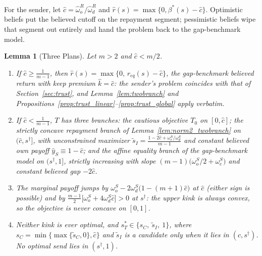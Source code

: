 \documentclass[11pt]{article}
\theoremstyle{plain}
\newtheorem{lemma}{Lemma}
\theoremstyle{remark}
\begin{document}
For the sender, let $\hat c=\hat\omega_o^{R}/\hat\omega_d^{R}$ and $\hat r(s)=\max\{0,\beta^\ast(s)-\hat c\}$.  Optimistic beliefs put the believed cutoff on the repayment segment; pessimistic beliefs wipe that segment out entirely and hand the problem back to the gap-benchmark model.

\begin{lemma}[Three Plans]
\label{lem:norm3_threeplan}
Let $m>2$ and $\hat c<m/2$.
\begin{enumerate}[topsep=2pt,itemsep=2pt]
\item If $\hat c\ge\frac1{m-1}$, then $\hat r(s)=\max\{0,\,r_{eq}(s)-\hat c\}$, the gap-benchmark believed return with keep premium $\hat k=\hat c$: the sender's problem coincides with that of Section~\ref{sec:trust}, and Lemma~\ref{lem:twobranch} and Propositions~\ref{prop:trust_linear}--\ref{prop:trust_global} apply verbatim.
\item If $\hat c<\frac1{m-1}$, $T$ has three branches: the cautious objective $T_0$ on $[0,\hat c]$; the strictly concave \emph{repayment branch} of Lemma~\ref{lem:norm2_twobranch} on $(\hat c,s^\dagger]$, with unconstrained maximizer $\tilde s_I=\frac{1-2\hat c+\omega_e^S/\omega_d^S}{m-1}$ and constant believed own payoff $\hat y_S\equiv1-\hat c$; and the affine \emph{equality branch} of the gap-benchmark model on $(s^\dagger,1]$, strictly increasing with slope $(m-1)\big(\omega_o^S/2+\omega_e^S\big)$ and constant believed gap $-2\hat c$.
\item The marginal payoff jumps by $\omega_o^S-2\omega_d^S\big(1-(m+1)\hat c\big)$ at $\hat c$ (either sign is possible) and by $\frac{m-1}{2}\big[\omega_o^S+4\omega_d^S\hat c\big]>0$ at $s^\dagger$: the upper kink is always convex, so the objective is never concave on $[0,1]$.
\item Neither kink is ever optimal, and $s_T^\ast\in\{s_C,\ \tilde s_I,\ 1\}$, where $s_C=\min\{\max\{\tilde s_C,0\},\hat c\}$ and $\tilde s_I$ is a candidate only when it lies in $(\hat c,s^\dagger)$.  No optimal send lies in $(s^\dagger,1)$.
\end{enumerate}
\end{lemma}
\end{document}
